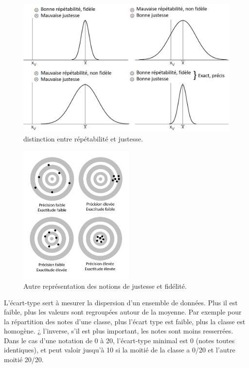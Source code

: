 \documentclass[main.tex]{subfiles}
\begin{document}
\begin{figure}
    \centering
    \includegraphics[height=7cm]{assets/figures/3_8_distinction_entre_repetabiite_et_justesse.PNG}
    \caption{distinction entre répétabilité et justesse.}
    \label{fig:distinction_entre_repetabiite_et_justesse}
\end{figure}

\begin{figure}
    \centering
    \includegraphics[height=7cm]{assets/figures/juste-fidele-precis.pdf}
    \caption{Autre représentation des notions de justesse et fidélité.}
    \label{fig:juste_fidele_precis}
\end{figure}

L'écart-type sert à mesurer la dispersion d'un ensemble de données. Plus il est faible, plus les valeurs sont regroupées autour de la moyenne. Par exemple pour la répartition des notes d'une classe, plus l'écart type est faible, plus la classe est homogène. ¿ l'inverse, s'il est plus important, les notes sont moins resserrées. Dans le cas d'une notation de 0 à 20, l'écart-type minimal est 0 (notes toutes identiques), et peut valoir jusqu'à 10 si la moitié de la classe a 0/20 et l'autre moitié 20/20.
\end{document}
